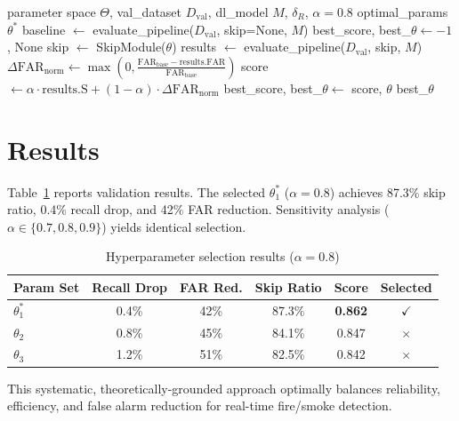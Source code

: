 \documentclass{article}
\begin{document}
	\begin{algorithm}[htbp]
		\caption{Skip Module Hyperparameter Selection}
		\begin{algorithmic}[1]
			\Require parameter space $\Theta$, val\_dataset $D_{\text{val}}$, dl\_model $M$, $\delta_R$, $\alpha=0.8$
			\Ensure optimal\_params $\theta^*$
			\State baseline $\gets$ evaluate\_pipeline($D_{\text{val}}$, skip=None, $M$)  
			\State best\_score, best\_$\theta \gets -1$, None
			\For{$\theta \in \Theta$}
			\State skip $\gets$ SkipModule($\theta$)
			\State results $\gets$ evaluate\_pipeline($D_{\text{val}}$, skip, $M$)  
			\State $\Delta\text{FAR}_{\text{norm}} \gets \max\left(0, \frac{\text{FAR}_{\text{base}} - \text{results.FAR}}{\text{FAR}_{\text{base}}}\right)$
			\State score $\gets \alpha \cdot \text{results.S} + (1-\alpha) \cdot \Delta\text{FAR}_{\text{norm}}$
			\State best\_score, best\_$\theta \gets$ score, $\theta$
			\EndIf
			\EndIf
			\EndFor
			\State \Return best\_$\theta$
		\end{algorithmic}
	\end{algorithm}

	\section{Results}

	Table~\ref{tab:skip-selection} reports validation results. The selected $\theta_1^*$ ($\alpha=0.8$) achieves 87.3\% skip ratio, 0.4\% recall drop, and 42\% FAR reduction. Sensitivity analysis ($\alpha \in \{0.7,0.8,0.9\}$) yields identical selection.

	\begin{table}[htbp]
		\centering
		\caption{Hyperparameter selection results ($\alpha=0.8$)}
		\label{tab:skip-selection}
		\begin{tabular}{lccccc}
			\toprule
			Param Set & Recall Drop & FAR Red. & Skip Ratio & Score & Selected \\
			\midrule
			$\theta_1^*$ & 0.4\% & 42\% & 87.3\% & \textbf{0.862} & $\checkmark$ \\
			$\theta_2$ & 0.8\% & 45\% & 84.1\% & 0.847 & $\times$ \\
			$\theta_3$ & 1.2\% & 51\% & 82.5\% & 0.842 & $\times$ \\
			\bottomrule
		\end{tabular}
	\end{table}

	This systematic, theoretically-grounded approach optimally balances reliability, efficiency, and false alarm reduction for real-time fire/smoke detection.
\end{document}
